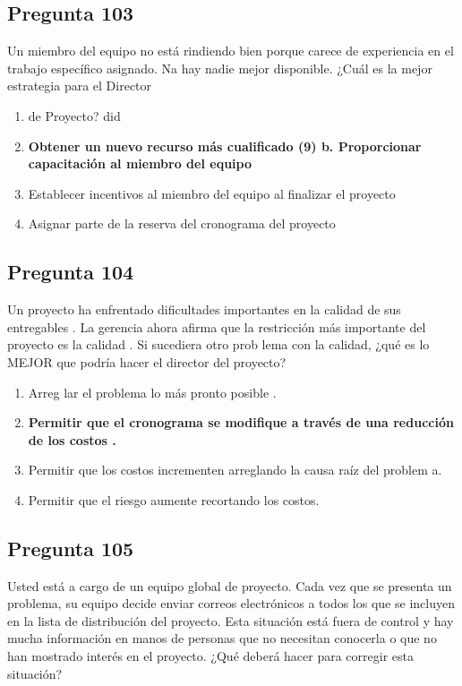 \documentclass[11pt,a4paper]{article}
\begin{document}
\subsection*{Pregunta 103}
Un miembro del equipo no está rindiendo bien porque carece de experiencia en el trabajo específico asignado. Na hay nadie mejor disponible. ¿Cuál es la mejor estrategia para el Director

\begin{enumerate}[label=\alph*)]
  \item de Proyecto? did
  \item \textbf{Obtener un nuevo recurso más cualificado (9) b. Proporcionar capacitación al miembro del equipo}
  \item Establecer incentivos al miembro del equipo al finalizar el proyecto
  \item Asignar parte de la reserva del cronograma del proyecto
\end{enumerate}

\subsection*{Pregunta 104}
Un proyecto ha enfrentado dificultades importantes en la calidad de sus entregables . La gerencia ahora afirma que la restricción más importante del proyecto es la calidad . Si sucediera otro prob lema con la calidad, ¿qué es lo MEJOR que podría hacer el director del proyecto?

\begin{enumerate}[label=\alph*)]
  \item Arreg lar el problema lo más pronto posible .
  \item \textbf{Permitir que el cronograma se modifique a través de una reducción de los costos .}
  \item Permitir que los costos incrementen arreglando la causa raíz del problem a.
  \item Permitir que el riesgo aumente recortando los costos.
\end{enumerate}

\subsection*{Pregunta 105}
Usted está a cargo de un equipo global de proyecto. Cada vez que se presenta un problema, su equipo decide enviar correos electrónicos a todos los que se incluyen en la lista de distribución del proyecto. Esta situación está fuera de control y hay mucha información en manos de personas que no necesitan conocerla o que no han mostrado interés en el proyecto. ¿Qué deberá hacer para corregir esta situación?
\end{document}

